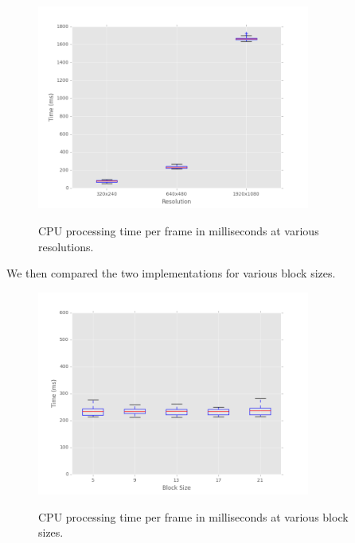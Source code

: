 \documentclass[12pt,letterpaper]{article}
\begin{document}
\begin{figure}[H]
  \centering
    \includegraphics[width=0.8\textwidth]{img/cpu_resolution.png}
  \label{fig:cpures}
  \caption{CPU processing time per frame in milliseconds at various resolutions.}
\end{figure}

We then compared the two implementations for various block sizes.

\begin{figure}[H]
  \centering
    \includegraphics[width=0.8\textwidth]{img/cpu_blocksize.png}
  \label{fig:cpublock}
  \caption{CPU processing time per frame in milliseconds at various block sizes.}
\end{figure}
\end{document}
